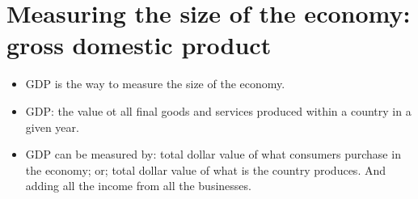 \documentclass{article}
\begin{document}
\section{Measuring the size of the economy: gross domestic product}
\begin{itemize}
    \item GDP is the way to measure the size of the economy. 
    \item GDP: the value ot all final goods and services produced within a country in a given year. 
    \item GDP can be measured by:  total dollar value of what consumers purchase in the economy; or;  total dollar value of what is the country produces. And adding all the income from all the businesses.
\end{itemize}


\end{document}
